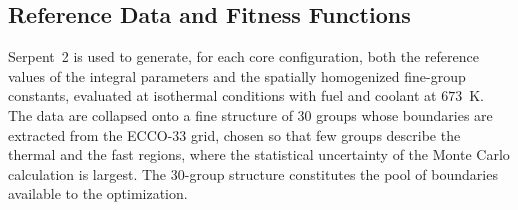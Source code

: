 \subsection{Reference Data and Fitness Functions}

Serpent~2 is used to generate, for each core configuration, both the reference
values of the integral parameters and the spatially homogenized fine-group
constants, evaluated at isothermal conditions with fuel and coolant at $673$~K.
The data are collapsed onto a fine structure of 30 groups whose boundaries are
extracted from the ECCO-33 grid, chosen so that few groups describe the thermal
and the fast regions, where the statistical uncertainty of the Monte Carlo
calculation is largest. The 30-group structure constitutes the pool of
boundaries available to the optimization.

